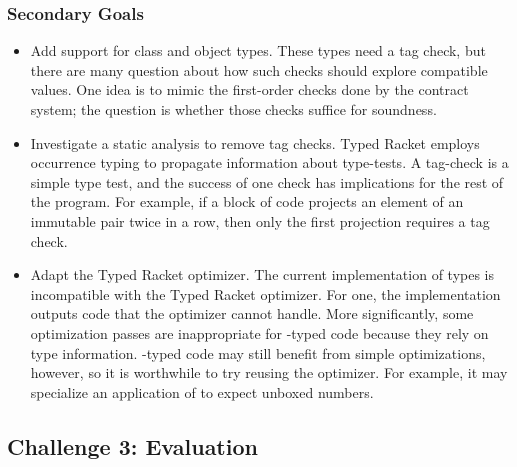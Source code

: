 \subsubsection{Secondary Goals}

\begin{itemize}
  \item
    Add support for class and object types.
    These types need a tag check, but there are many question about how such
     checks should explore compatible values.
    One idea is to mimic the first-order checks done by the contract system;
     the question is whether those checks suffice for soundness.
  \item
    Investigate a static analysis to remove tag checks.
    Typed Racket employs occurrence typing to propagate information about type-tests.
    A tag-check is a simple type test, and the success of one check has implications
     for the rest of the program.
    For example, if a block of code projects an element of an immutable pair twice in a row,
     then only the first projection requires a tag check.
  \item
    Adapt the Typed Racket optimizer.
    The current implementation of \tshallow{} types is incompatible with the Typed
     Racket optimizer.
    For one, the implementation outputs code that the optimizer cannot handle.
    More significantly, some optimization passes are inappropriate for \tshallow{}-typed
     code because they rely on \tdeep{} type information.
    \tShallow{}-typed code may still benefit from simple optimizations, however,
     so it is worthwhile to try reusing the optimizer.
    For example, it may specialize an application of \racketcode{+} to expect unboxed numbers.
\end{itemize}


\subsection{Challenge 3: Evaluation}


